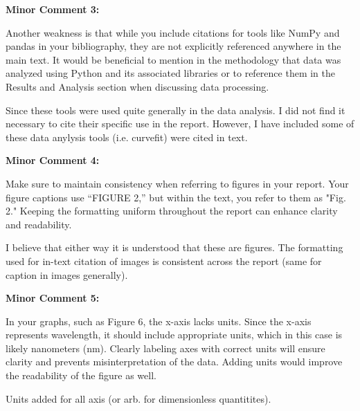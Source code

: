 \documentclass[%
 aip,
cp,  %
 amsmath,amssymb,
 reprint,%
]{revtex4-2}
\begin{document}
        \begin{mdframed} \textbf{Minor Comment 3:}

            Another weakness is that while you include citations for tools like NumPy and pandas in your bibliography, they are not explicitly referenced anywhere in the main text. It would be beneficial to mention in the methodology that data was analyzed using Python and its associated libraries or to reference them in the Results and Analysis section when discussing data processing.
        \end{mdframed}
        {\color{red}
        
            Since these tools were used quite generally in the data analysis. I did not find it necessary to cite their specific use in the report. However, I have included some of these data anylysis tools (i.e. curvefit) were cited in text.

        }
        \begin{mdframed} \textbf{Minor Comment 4:}

            Make sure to maintain consistency when referring to figures in your report. Your figure captions use ``FIGURE 2,'' but within the text, you refer to them as "Fig. 2." Keeping the formatting uniform throughout the report can enhance clarity and readability.

        \end{mdframed}
        {\color{red}
        
            I believe that either way it is understood that these are figures. The formatting used for in-text citation of images is consistent across the report (same for caption in images generally).

        }
        \begin{mdframed} \textbf{Minor Comment 5:}

            In your graphs, such as Figure 6, the x-axis lacks units. Since the x-axis represents wavelength, it should include appropriate units, which in this case is likely nanometers (nm). Clearly labeling axes with correct units will ensure clarity and prevents misinterpretation of the data. Adding units would improve the readability of the figure as well.            
        \end{mdframed}
        {\color{red}
        
            Units added for all axis (or arb. for dimensionless quantitites).

        }
        
\newpage
\end{document}
